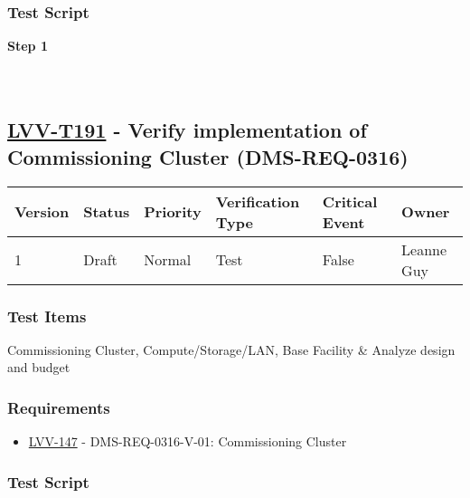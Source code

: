 \hypertarget{test-script-167}{%
\subsubsection{Test Script}\label{test-script-167}}

\textbf{Step 1}\\
~\\
~\\

\hypertarget{lvv-t191---verify-implementation-of-commissioning-cluster-dms-req-0316}{%
\subsection{\texorpdfstring{\href{https://jira.lsstcorp.org/secure/Tests.jspa\#/testCase/LVV-T191}{LVV-T191}
- Verify implementation of Commissioning Cluster
(DMS-REQ-0316)}{LVV-T191 - Verify implementation of Commissioning Cluster (DMS-REQ-0316)}}\label{lvv-t191---verify-implementation-of-commissioning-cluster-dms-req-0316}}

\begin{longtable}[]{@{}llllll@{}}
\toprule
Version & Status & Priority & Verification Type & Critical Event &
Owner\tabularnewline
\midrule
\endhead
1 & Draft & Normal & Test & False & Leanne Guy\tabularnewline
\bottomrule
\end{longtable}

\hypertarget{test-items-167}{%
\subsubsection{Test Items}\label{test-items-167}}

Commissioning Cluster, Compute/Storage/LAN, Base Facility \& Analyze
design and budget

\hypertarget{requirements-168}{%
\subsubsection{Requirements}\label{requirements-168}}

\begin{itemize}
\tightlist
\item
  \href{https://jira.lsstcorp.org/browse/LVV-147}{LVV-147} -
  DMS-REQ-0316-V-01: Commissioning Cluster
\end{itemize}

\hypertarget{test-script-168}{%
\subsubsection{Test Script}\label{test-script-168}}

